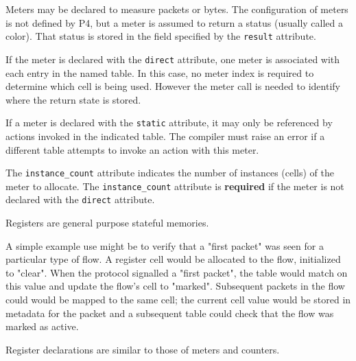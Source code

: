 \documentclass[12pt]{article}
\begin{document}
Meters may be declared to measure packets or bytes. The configuration
of meters is not defined by P4, but a meter is assumed to return a
status (usually called a color). That status is stored in the field
specified by the \texttt{result} attribute.

If the meter is declared with the \texttt{direct} attribute, one meter
is associated with each entry in the named table. In this case, no
meter index is required to determine which cell is being used. However
the meter call is needed to identify where the return state is stored.

If a meter is declared with the \texttt{static} attribute, it may only
be referenced by actions invoked in the indicated table. The compiler
must raise an error if a different table attempts to invoke an action
with this meter.

The \texttt{instance_count} attribute indicates the number of
instances (cells) of the meter to allocate.  The
\texttt{instance_count} attribute is \textbf{required} if the meter
is not declared with the \texttt{direct} attribute.


Registers are general purpose stateful memories.

A simple example use might be to verify that a "first packet" was seen for a
particular type of flow. A register cell would be allocated to the flow,
initialized to "clear". When the protocol signalled a "first packet", the table
would match on this value and update the flow’s cell to "marked". Subsequent
packets in the flow could would be mapped to the same cell; the current cell
value would be stored in metadata for the packet and a subsequent table could
check that the flow was marked as active.

Register declarations are similar to those of meters and counters.
\end{document}
